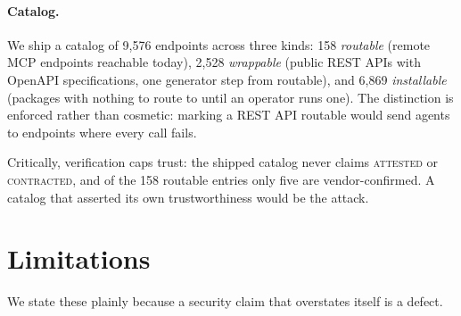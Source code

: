 \documentclass[11pt]{article}
\begin{document}
\paragraph{Catalog.}
We ship a catalog of 9{,}576 endpoints across three kinds: 158 \emph{routable}
(remote MCP endpoints reachable today), 2{,}528 \emph{wrappable} (public REST
APIs with OpenAPI specifications, one generator step from routable), and 6{,}869
\emph{installable} (packages with nothing to route to until an operator runs
one). The distinction is enforced rather than cosmetic: marking a REST API
routable would send agents to endpoints where every call fails.

Critically, verification caps trust: the shipped catalog never claims
\textsc{attested} or \textsc{contracted}, and of the 158 routable entries only
five are vendor-confirmed. A catalog that asserted its own trustworthiness would
be the attack.

\section{Limitations}\label{sec:limits}

We state these plainly because a security claim that overstates itself is a
defect.
\end{document}
